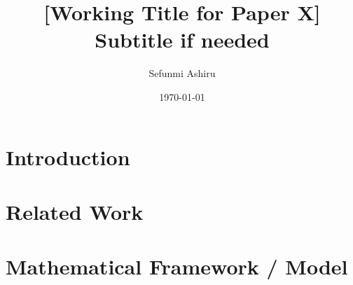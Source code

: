 \documentclass[12pt]{article}
\title{[Working Title for Paper X]\\
Subtitle if needed}
\author{Sefunmi Ashiru}
\date{\today}
\begin{document}
\maketitle

\begin{abstract}
\end{abstract}

\newpage
\tableofcontents
\newpage

\section{Introduction}


\section{Related Work}

\section{Mathematical Framework / Model}
%
\end{document}
